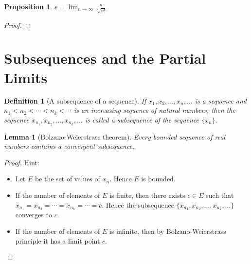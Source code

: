 \documentclass[onecolumn]{ctexart}
\newtheorem{definition}{Definition}
\newtheorem{proposition}{Proposition}
\newtheorem{lemma}{Lemma}
\begin{document}
\begin{proposition}
  $e = \lim_{n \to \infty} \frac{n}{\sqrt[n]{n!}}$
\end{proposition}
\begin{proof}
  
\end{proof}

\section{Subsequences and the Partial Limits}

\begin{definition}[A subsequence of a sequence]
  If $x_1, x_2, \ldots, x_n, \ldots$ is a sequence and $n_1 < n_2 < \cdots < n_k 
  < \cdots$ is an increasing sequence of natural numbers, then the sequence 
  $x_{n_1}, x_{n_2}, \ldots, x_{n_k}, \ldots$ is called a subsequence of the 
  sequence $\lbrace x_n \rbrace$.
\end{definition}

\begin{lemma}[Bolzano-Weierstrass theorem]
  Every bounded sequence of real numbers contains a convergent subsequence.
\end{lemma}
\begin{proof}
  Hint:
  \begin{itemize}
    \item Let $E$ be the set of values of $x_n$. Hence $E$ is bounded.
    \item If the number of elements of $E$ is finite, then there exists $c \in E$ 
    such that $x_{n_1} = x_{n_2} = \cdots = x_{n_k} = \cdots = c$. Hence the 
    subsequence $\lbrace x_{n_1}, x_{n_2}, \ldots, x_{n_k}, \ldots \rbrace$ 
    converges to $c$.
    \item If the number of elements of $E$ is infinite, then by 
    Bolzano-Weierstrass principle it has a limit point $c$.
  \end{itemize}
\end{proof}
\end{document}
